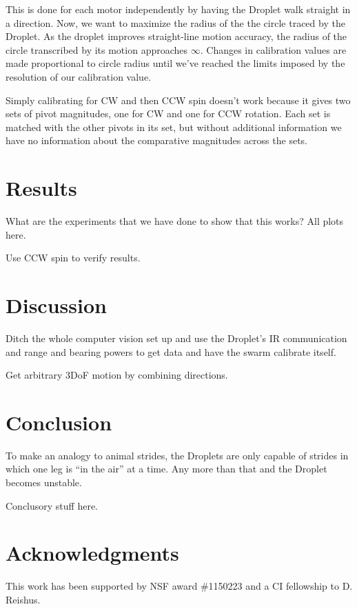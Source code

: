 \documentclass[letterpaper, 10pt, conference]{ieeeconf}
\begin{document}
This is done for each motor independently by having the Droplet walk straight in a direction. Now, we want to maximize the radius of the the circle traced by the Droplet. As the droplet improves straight-line motion accuracy, the radius of the circle transcribed by its motion approaches $\infty$. Changes in calibration values are made proportional to circle radius until we've reached the limits imposed by the resolution of our calibration value.

Simply calibrating for CW and then CCW spin doesn't work because it gives two sets of pivot magnitudes, one for CW and one for CCW rotation. Each set is matched with the other pivots in its set, but without additional information we have no information about the comparative magnitudes across the sets.




\section{Results}

What are the experiments that we have done to show that this works? All plots here.

Use CCW spin to verify results.




\section{Discussion}
Ditch the whole computer vision set up and use the Droplet's IR communication and range and bearing powers to get data and have the swarm calibrate itself.

Get arbitrary 3DoF motion by combining directions.

\section{Conclusion}
To make an analogy to animal strides, the Droplets are only capable of strides in which one leg is ``in the air'' at a time. Any more than that and the Droplet becomes unstable.

Conclusory stuff here.

\section*{Acknowledgments}
This work has been supported by NSF award \#1150223 and a CI fellowship to D. Reishus.




\end{document}
